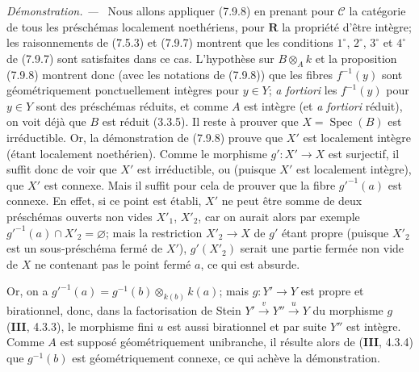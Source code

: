 \documentclass[10pt,oneside]{book}
\newenvironment{proof}{%
  \par\medskip\noindent\textit{Démonstration. ---\ }}{\par}
\begin{document}
\begin{proof}
Nous allons appliquer (7.9.8) en prenant pour $\mathcal C$ la catégorie de
tous les préschémas localement noethériens, pour $\boldsymbol R$ la propriété
d'être intègre; les raisonnements de (7.5.3) et (7.9.7) montrent que les
conditions $1^\circ$, $2^\circ$, $3^\circ$ et $4^\circ$ de (7.9.7) sont
satisfaites dans ce cas. L'hypothèse sur $B\otimes_Ak$ et la proposition
(7.9.8) montrent donc (avec les notations de (7.9.8)) que les fibres
$f^{-1}(y)$ sont géométriquement ponctuellement intègres pour $y\in Y$;
\emph{a fortiori} les $f^{-1}(y)$ pour $y\in Y$ sont des préschémas réduits,
et comme $A$ est intègre (et \emph{a fortiori} réduit), on voit déjà que $B$
est réduit (3.3.5). Il reste à prouver que $X=\operatorname{Spec}(B)$ est
irréductible. Or, la démonstration de (7.9.8) prouve que $X'$ est localement
intègre (étant localement noethérien). Comme le morphisme $g':X'\to X$ est
surjectif, il suffit donc de voir que $X'$ est irréductible, ou (puisque $X'$
est localement intègre), que $X'$ est connexe. Mais il suffit pour cela de
prouver que la fibre $g'^{-1}(a)$ est connexe. En effet, si ce point est
établi, $X'$ ne peut être somme de deux préschémas ouverts non vides $X'_1$,
$X'_2$, car on aurait alors par exemple
$g'^{-1}(a)\cap X'_2=\varnothing$; mais la restriction $X'_2\to X$ de $g'$
étant propre (puisque $X'_2$ est un sous-préschéma fermé de $X'$),
$g'(X'_2)$ serait une partie fermée non vide de $X$ ne contenant pas le point
fermé $a$, ce qui est absurde.

Or, on a
$g'^{-1}(a)=g^{-1}(b)\otimes_{k(b)}k(a)$; mais $g:Y'\to Y$ est propre et
birationnel, donc, dans la factorisation de Stein
$Y'\xrightarrow{v}Y''\xrightarrow{u}Y$ du morphisme $g$ (\textbf{III}, 4.3.3),
le morphisme fini $u$ est aussi birationnel et par suite $Y''$ est intègre.
Comme $A$ est supposé géométriquement unibranche, il résulte alors de
(\textbf{III}, 4.3.4) que $g^{-1}(b)$ est géométriquement connexe, ce qui
achève la démonstration.
\end{proof}
\end{document}
